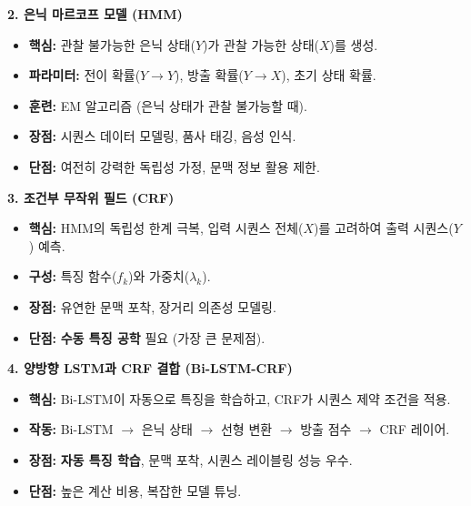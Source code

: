 \documentclass[11pt,a4paper]{article}
\begin{document}
\begin{tcolorbox}[summarybox, title=핵심 개념 요약]
\textbf{2. 은닉 마르코프 모델 (HMM)}
\begin{itemize}
    \item \textbf{핵심:} 관찰 불가능한 은닉 상태($Y$)가 관찰 가능한 상태($X$)를 생성.
    \item \textbf{파라미터:} 전이 확률($Y \to Y$), 방출 확률($Y \to X$), 초기 상태 확률.
    \item \textbf{훈련:} EM 알고리즘 (은닉 상태가 관찰 불가능할 때).
    \item \textbf{장점:} 시퀀스 데이터 모델링, 품사 태깅, 음성 인식.
    \item \textbf{단점:} 여전히 강력한 독립성 가정, 문맥 정보 활용 제한.
\end{itemize}
\end{tcolorbox}

\begin{tcolorbox}[summarybox, title=핵심 개념 요약]
\textbf{3. 조건부 무작위 필드 (CRF)}
\begin{itemize}
    \item \textbf{핵심:} HMM의 독립성 한계 극복, 입력 시퀀스 전체($X$)를 고려하여 출력 시퀀스($Y$) 예측.
    \item \textbf{구성:} 특징 함수($f_k$)와 가중치($\lambda_k$).
    \item \textbf{장점:} 유연한 문맥 포착, 장거리 의존성 모델링.
    \item \textbf{단점:} \textbf{수동 특징 공학} 필요 (가장 큰 문제점).
\end{itemize}
\end{tcolorbox}

\begin{tcolorbox}[summarybox, title=핵심 개념 요약]
\textbf{4. 양방향 LSTM과 CRF 결합 (Bi-LSTM-CRF)}
\begin{itemize}
    \item \textbf{핵심:} Bi-LSTM이 자동으로 특징을 학습하고, CRF가 시퀀스 제약 조건을 적용.
    \item \textbf{작동:} Bi-LSTM $\to$ 은닉 상태 $\to$ 선형 변환 $\to$ 방출 점수 $\to$ CRF 레이어.
    \item \textbf{장점:} \textbf{자동 특징 학습}, 문맥 포착, 시퀀스 레이블링 성능 우수.
    \item \textbf{단점:} 높은 계산 비용, 복잡한 모델 튜닝.
\end{itemize}
\end{tcolorbox}
\end{document}
